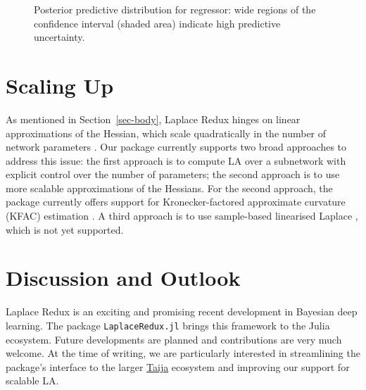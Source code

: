 \documentclass{juliacon}
\begin{document}
\begin{figure}


\caption{\label{fig-reg}Posterior predictive distribution for regressor:
wide regions of the confidence interval (shaded area) indicate high
predictive uncertainty.}

\end{figure}%

\section{Scaling Up}\label{sec-scale}

As mentioned in Section~\ref{sec-body}, Laplace Redux hinges on linear
approximations of the Hessian, which scale quadratically in the number
of network parameters \cite{daxberger2021laplace}. Our package currently
supports two broad approaches to address this issue: the first approach
is to compute LA over a subnetwork with explicit control over the number
of parameters; the second approach is to use more scalable
approximations of the Hessians. For the second approach, the package
currently offers support for Kronecker-factored approximate curvature
(KFAC) estimation \cite{martens2020optimizing}. A third approach is to
use sample-based linearised Laplace \cite{antoran2023samplingbased},
which is not yet supported.

\section{Discussion and Outlook}\label{sec-con}

Laplace Redux is an exciting and promising recent development in
Bayesian deep learning. The package \texttt{LaplaceRedux.jl} brings this
framework to the Julia ecosystem. Future developments are planned and
contributions are very much welcome. At the time of writing, we are
particularly interested in streamlining the package's interface to the
larger \href{https://github.com/JuliaTrustworthyAI}{Taija} ecosystem and
improving our support for scalable LA.
\end{document}
